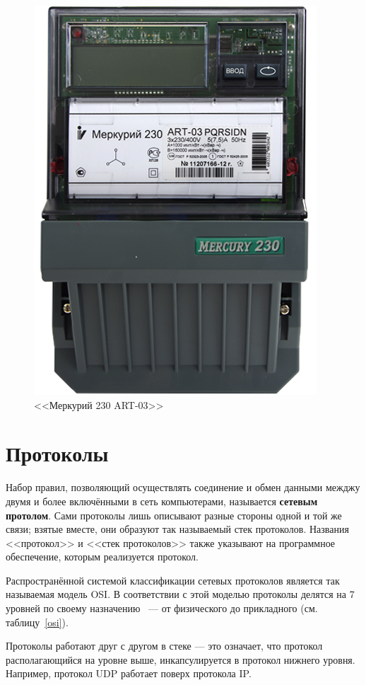 \begin{figure}[h]
	\label{mercury}
	\centering
		\includegraphics[scale=0.6]{img/mercury.png}
	\caption{<<Меркурий 230 ART-03>>}
\end{figure}

\newpage

\section{Протоколы}

Набор правил, позволяющий осуществлять соединение и обмен данными межджу двумя и более включёнными в сеть компьютерами, называется \textbf{сетевым протолом}.
Сами протоколы лишь описывают разные стороны одной и той же связи; взятые вместе, они образуют так называемый стек протоколов. Названия <<протокол>> и <<стек протоколов>> также указывают на программное обеспечение, которым реализуется протокол\cite{protocols}.

Распространённой системой классификации сетевых протоколов является так называемая модель OSI. В соответствии с этой моделью протоколы делятся на 7 уровней по своему назначению ~--- от физического до прикладного (см. таблицу~\ref{osi}). 

Протоколы работают друг с другом в стеке --- это означает, что протокол располагающийся на уровне выше, инкапсулируется в протокол нижнего уровня. Например, протокол UDP работает поверх протокола IP.

